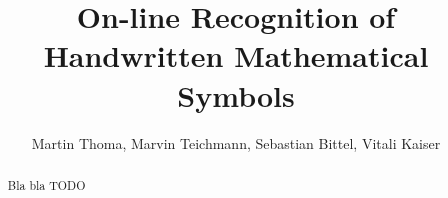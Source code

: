 \documentclass[technote,a4paper]{IEEEtran}
\title{On-line Recognition of Handwritten Mathematical Symbols}
\author{Martin Thoma, Marvin Teichmann, Sebastian Bittel, Vitali Kaiser}
\begin{document}
\maketitle
\begin{abstract}
Bla bla TODO
\end{abstract}













\end{document}
